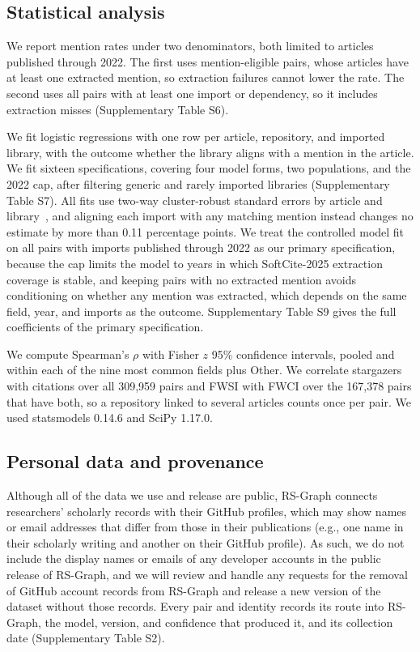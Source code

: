 \documentclass[pdflatex,sn-nature]{sn-jnl}%
\begin{document}
\subsection{Statistical analysis}\label{subsec:m-statistics}

We report mention rates under two denominators, both limited to articles published through 2022.
The first uses mention-eligible pairs, whose articles have at least one extracted mention, so extraction failures cannot lower the rate.
The second uses all pairs with at least one import or dependency, so it includes extraction misses (Supplementary Table S6).

We fit logistic regressions with one row per article, repository, and imported library, with the outcome whether the library aligns with a mention in the article.
We fit sixteen specifications, covering four model forms, two populations, and the 2022 cap, after filtering generic and rarely imported libraries (Supplementary Table S7).
All fits use two-way cluster-robust standard errors by article and library~\cite{cameron2011robust}, and aligning each import with any matching mention instead changes no estimate by more than 0.11 percentage points.
We treat the controlled model fit on all pairs with imports published through 2022 as our primary specification, because the cap limits the model to years in which SoftCite-2025 extraction coverage is stable, and keeping pairs with no extracted mention avoids conditioning on whether any mention was extracted, which depends on the same field, year, and imports as the outcome.
Supplementary Table S9 gives the full coefficients of the primary specification.

We compute Spearman's $\rho$ with Fisher $z$ 95\% confidence intervals, pooled and within each of the nine most common fields plus Other.
We correlate stargazers with citations over all 309,959 pairs and FWSI with FWCI over the 167,378 pairs that have both, so a repository linked to several articles counts once per pair.
We used statsmodels 0.14.6 and SciPy 1.17.0. %

\subsection{Personal data and provenance}\label{subsec:m-provenance}

Although all of the data we use and release are public, RS-Graph connects researchers' scholarly records with their GitHub profiles, which may show names or email addresses that differ from those in their publications (e.g., one name in their scholarly writing and another on their GitHub profile).
As such, we do not include the display names or emails of any developer accounts in the public release of RS-Graph, and we will review and handle any requests for the removal of GitHub account records from RS-Graph and release a new version of the dataset without those records.
Every pair and identity records its route into RS-Graph, the model, version, and confidence that produced it, and its collection date (Supplementary Table S2).
\end{document}

